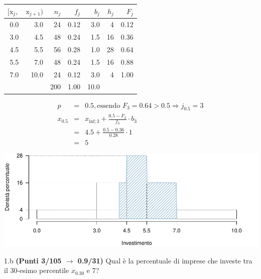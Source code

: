 \documentclass[
  11pt,
]{book}
\theoremstyle{mytheoremstyle}
\theoremstyle{mydefstyle}
\newenvironment{sol}
  {
  \begin{tcolorbox}[enhanced,breakable,arc=0.1mm,boxrule=1pt,colback=white,colframe=iblue,
  title=\bf \fontfamily{lmss}\selectfont \hspace{.5 cm} Soluzione,drop fuzzy shadow]

}{
\end{tcolorbox}
  }
\begin{document}
\begin{sol}

\begin{table}[H]
\centering
\begin{tabular}{rrrrrrr}
\toprule
$[\text{x}_j,$ & $\text{x}_{j+1})$ & $n_j$ & $f_j$ & $b_j$ & $h_j$ & $F_j$\\
\midrule
0.0 & 3.0 & 24 & 0.12 & 3.0 & 4 & 0.12\\
3.0 & 4.5 & 48 & 0.24 & 1.5 & 16 & 0.36\\
4.5 & 5.5 & 56 & 0.28 & 1.0 & 28 & 0.64\\
5.5 & 7.0 & 48 & 0.24 & 1.5 & 16 & 0.88\\
7.0 & 10.0 & 24 & 0.12 & 3.0 & 4 & 1.00\\
 &  & 200 & 1.00 & 10.0 &  & \\
\bottomrule
\end{tabular}
\end{table}

\begin{eqnarray*}
  p &=&  0.5 , \text{essendo }F_{ 3 }= 0.64  > 0.5  \Rightarrow j_{ 0.5 }= 3 \\
  x_{ 0.5 } &=& x_{\text{inf}; 3 } + \frac{ { 0.5 } - F_{ 2 }} {f_{ 3 }} \cdot b_{ 3 } \\
            &=&  4.5  + \frac {{ 0.5 } -  0.36 } { 0.28 } \cdot  1  \\
            &=&  5 
\end{eqnarray*}

\begin{center}\includegraphics{Esami_passati_con_soluzioni_files/figure-latex/2024-125-1} \end{center}

\end{sol}

1.b \textbf{(Punti 3/105 \(\rightarrow\) 0.9/31)} Qual è la percentuale di imprese che investe tra il 30-esimo percentile \(x_{0.30}\) e 7?
\end{document}
